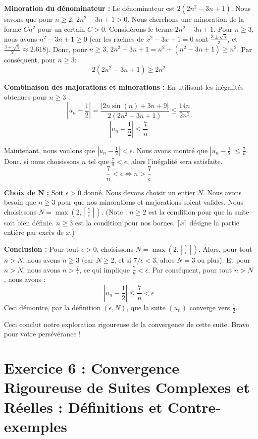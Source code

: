 \documentclass[a4paper,11pt]{report}
\begin{document}
\textbf{Minoration du dénominateur :}
Le dénominateur est $2(2n^2 - 3n + 1)$. Nous savons que pour $n \ge 2$, $2n^2 - 3n + 1 > 0$.
Nous cherchons une minoration de la forme $Cn^2$ pour un certain $C > 0$.
Considérons le terme $2n^2 - 3n + 1$.
Pour $n \ge 3$, nous avons $n^2 - 3n + 1 \ge 0$ (car les racines de $x^2 - 3x + 1 = 0$ sont $\frac{3 \pm \sqrt{5}}{2}$, et $\frac{3+\sqrt{5}}{2} \approx 2.618$).
Donc, pour $n \ge 3$, $2n^2 - 3n + 1 = n^2 + (n^2 - 3n + 1) \ge n^2$.
Par conséquent, pour $n \ge 3$:
$$2(2n^2 - 3n + 1) \ge 2n^2$$

\textbf{Combinaison des majorations et minorations :}
En utilisant les inégalités obtenues pour $n \ge 3$ :
$$|u_n - \frac{1}{2}| = \frac{|2n\sin(n) + 3n + 9|}{2(2n^2 - 3n + 1)} \le \frac{14n}{2n^2}$$
$$|u_n - \frac{1}{2}| \le \frac{7}{n}$$

Maintenant, nous voulons que $|u_n - \frac{1}{2}| < \epsilon$.
Nous avons montré que $|u_n - \frac{1}{2}| \le \frac{7}{n}$.
Donc, si nous choisissons $n$ tel que $\frac{7}{n} < \epsilon$, alors l'inégalité sera satisfaite.
$$\frac{7}{n} < \epsilon \iff n > \frac{7}{\epsilon}$$

\textbf{Choix de N :}
Soit $\epsilon > 0$ donné. Nous devons choisir un entier $N$.
Nous avons besoin que $n \ge 3$ pour que nos minorations et majorations soient valides.
Nous choisissons $N = \max\left(2, \left\lceil \frac{7}{\epsilon} \right\rceil\right)$.
(Note : $n \ge 2$ est la condition pour que la suite soit bien définie. $n \ge 3$ est la condition pour nos bornes. $\lceil x \rceil$ désigne la partie entière par excès de $x$.)

\textbf{Conclusion :}
Pour tout $\epsilon > 0$, choisissons $N = \max\left(2, \left\lceil \frac{7}{\epsilon} \right\rceil\right)$.
Alors, pour tout $n > N$, nous avons $n \ge 3$ (car $N \ge 2$, et si $7/\epsilon < 3$, alors $N=3$ ou plus).
Et pour $n > N$, nous avons $n > \frac{7}{\epsilon}$, ce qui implique $\frac{7}{n} < \epsilon$.
Par conséquent, pour tout $n > N$, nous avons :
$$|u_n - \frac{1}{2}| \le \frac{7}{n} < \epsilon$$
Ceci démontre, par la définition $(\epsilon, N)$, que la suite $(u_n)$ converge vers $\frac{1}{2}$.

Ceci conclut notre exploration rigoureuse de la convergence de cette suite. Bravo pour votre persévérance !

\vspace{1cm}

\section*{Exercice 6 : Convergence Rigoureuse de Suites Complexes et Réelles : Définitions et Contre-exemples}
\end{document}
